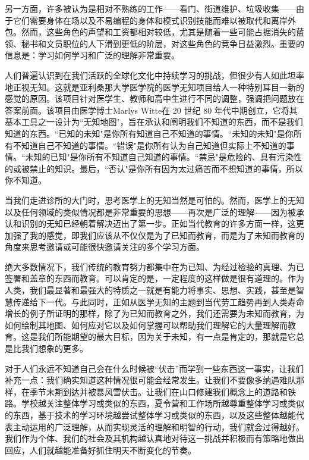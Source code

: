 另一方面，许多被认为是相对不熟练的工作——看门、街道维护、垃圾收集——由于它们需要身体在场以及不易编程的身体和模式识别技能而难以被取代和离岸外包。然而，这些角色的声望和工资都相对较低，尤其是随着一些可能占据消失的蓝领、秘书和文员职位的人下滑到更低的阶层，对这些角色的竞争日益激烈。重要的信息是：学习如何学习和广泛的理解非常重要。

人们普遍认识到在我们活跃的全球化文化中持续学习的挑战，但很少有人如此坦率地正视无知。这就是亚利桑那大学医学院的医学无知项目给人一种特别耳目一新的感觉的原因。该项目针对医学生、教师和高中生进行不同的调整，强调把问题放在答案前面。该项目由医学博士Marlys Witte在 20 世纪 80 年代中期创立，它将其基本工具之一设计为``无知地图"，旨在承认和阐明我们不知道的东西，而不是我们知道的东西。``已知的未知"是你所有知道自己不知道的事情。``未知的未知"是你所有不知道自己不知道的事情。``错误"是你所有认为自己知道但实际上不知道的事情。``未知的已知"是你所有不知道自己知道的事情。``禁忌"是危险的、具有污染性的或被禁止的知识。最后，``否认"是你所有因为太过痛苦而不想知道的事情，所以你不知道。

当我们走进诊所的大门时，思考医学上的无知当然是可怕的。然而，医学上的无知以及任何领域的类似情况都是非常重要的思想——再次是广泛的理解——因为被承认和识别的无知已经朝着解决迈出了第一步。正如当代教育的许多方面一样，这更加强了我的感觉，即我们应该从不仅仅是为了已知而教育，而是为了未知而教育的角度来思考邀请或可能很快邀请关注的多个学习方面。

绝大多数情况下，我们传统的教育努力都集中在为已知、为经过检验的真理、为已签署和盖章的东西而教育。可以肯定的是，一定程度的这样做是很有道理的。作为人类，我们最显著和最强大的特质之一就是有能力将事实、思想、实践，甚至是智慧传递给下一代。与此同时，正如从医学无知的主题到当代劳工趋势再到人类寿命增长的例子所证明的那样，除了为已知而教育之外，我们还需要为未知而教育，为如何绘制其地图、如何应对它以及如何掌握可以帮助我们理解它的大量理解而教育。这是我们所能期望的最大目标，因为关于未知，有一点是肯定的，那就是它总是比我们想象的更多。

对于人们永远不知道自己会在什么时候被“伏击”而学到一些东西这一事实，让我们补充一点：我们确实知道这种情况很可能会经常发生。让我们不要像多纳遇难队那样，在季节末期到达并被暴风雪伏击。让我们在山口修建我们概念上的道路和铁路。学校越关注整体学习或类似的东西，夏令营和工作场所越尊重整体学习或类似的东西，基于技术的学习环境越尝试整体学习或类似的东西，以及这些整体越能代表主动运用的广泛理解，从而实现灵活的理解和明智的行动，我们就会过得越好。我们作为个体、我们的社会及其机构越认真地对待这一挑战并积极而有策略地做出回应，人们就越能准备好抓住明天不断变化的节奏。